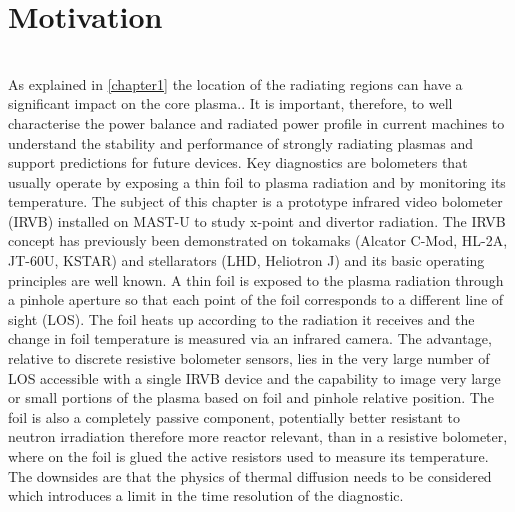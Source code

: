
\section{Motivation}\label{Motivation IRVB}

\\

As explained in \autoref{chapter1} the location of the radiating regions can have a significant impact on the core plasma.\cite{Reimold2015}. It is important, therefore, to well characterise the power balance and radiated power profile in current machines to understand the stability and performance of strongly radiating plasmas and support predictions for future devices. 
Key diagnostics are bolometers that usually operate by exposing a thin foil to plasma radiation and by monitoring its temperature. The subject of this chapter is a prototype infrared video bolometer (IRVB) installed on MAST-U to study x-point and divertor radiation.
The IRVB concept has previously been demonstrated on tokamaks (Alcator C-Mod\cite{Reinke2018a}, HL-2A\cite{Gao2013}, JT-60U\cite{Peterson2007}, KSTAR\cite{Jang2018,Peterson2018}) and stellarators (LHD\cite{Peterson2000,PETERSON2010}, Heliotron J\cite{Miyashita2021}) and its basic operating principles are well known. A thin foil is exposed to the plasma radiation through a pinhole aperture so that each point of the foil corresponds to a different line of sight (LOS). The foil heats up according to the radiation it receives and the change in foil temperature is measured via an infrared camera. The advantage, relative to discrete resistive bolometer sensors\cite{Mast1991}, lies in the very large number of LOS accessible with a single IRVB device and the capability to image very large or small portions of the plasma based on foil and pinhole relative position. The foil is also a completely passive component, potentially better resistant to neutron irradiation therefore more reactor relevant, than in a resistive bolometer, where on the foil is glued the active resistors used to measure its temperature. The downsides are that the physics of thermal diffusion needs to be considered which introduces a limit in the time resolution of the diagnostic. 
